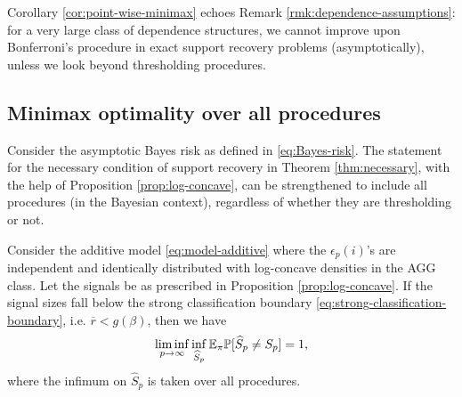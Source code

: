\begin{remark}
Corollary \ref{cor:point-wise-minimax} echoes Remark \ref{rmk:dependence-assumptions}: for a very large class of dependence structures, we cannot improve upon Bonferroni's procedure in exact support recovery problems (asymptotically), unless we look beyond thresholding procedures.
\end{remark}



\subsection{Minimax optimality over all procedures}
\label{subsec:minimax-over-dependence}


Consider the asymptotic Bayes risk as defined in \eqref{eq:Bayes-risk}. The statement for the 
necessary condition of support recovery in Theorem \ref{thm:necessary}, with the help of Proposition 
\ref{prop:log-concave}, can be strengthened to include all procedures (in the Bayesian context), regardless 
of whether they are thresholding or not.

\begin{theorem} \label{thm:necessary-strengthened}
Consider the additive model \eqref{eq:model-additive} where the $\epsilon_p(i)$'s are independent and identically distributed with log-concave densities in the AGG class. 
Let the signals be as prescribed in Proposition \ref{prop:log-concave}.
If the signal sizes fall below the strong classification boundary \eqref{eq:strong-classification-boundary}, 
i.e. $\overline{r}<g(\beta)$, then we have
\begin{equation} \label{eq:classification-impossible-Bayes}
    \liminf_{p\to\infty} \inf_{\widehat{S}_p} {\mathbb E}_\pi {\mathbb P}[\widehat{S}_p\neq S_p] = 1,
\end{equation}
where the infimum on $\widehat{S}_p$ is taken over all procedures.
\end{theorem}

